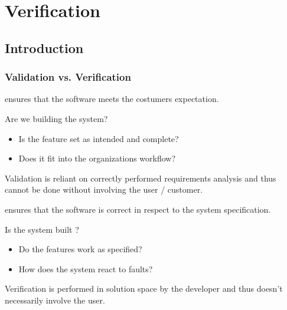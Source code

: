 \documentclass[
    ../../Software_Engineering_Summary.tex,
]
{subfiles}
\begin{document}
\section{Verification}
\subsection{Introduction}
\subsubsection{Validation vs. Verification}

\begin{defbox}
    [Validation]
     ensures that the software meets the costumers expectation.
    \begin{center}
        \begin{smalldefbox*}
            Are we building the  system?
        \end{smalldefbox*}
    \end{center}

    \begin{itemize}
        \item Is the feature set as intended and complete?
        \item Does it fit into the organizations workflow?
    \end{itemize}

    Validation is reliant on correctly performed requirements analysis and thus cannot be done without involving the user / customer.
\end{defbox}

\begin{defbox}
    [Verification]
     ensures that the software is correct in respect to the system specification.
    \begin{center}
        \begin{smalldefbox*}
            Is the system built ?
        \end{smalldefbox*}
    \end{center}

    \begin{itemize}
        \item Do the features work as specified?
        \item How does the system react to faults?
    \end{itemize}

    Verification is performed in solution space by the developer and thus doesn't necessarily involve the user.
\end{defbox}
\end{document}
